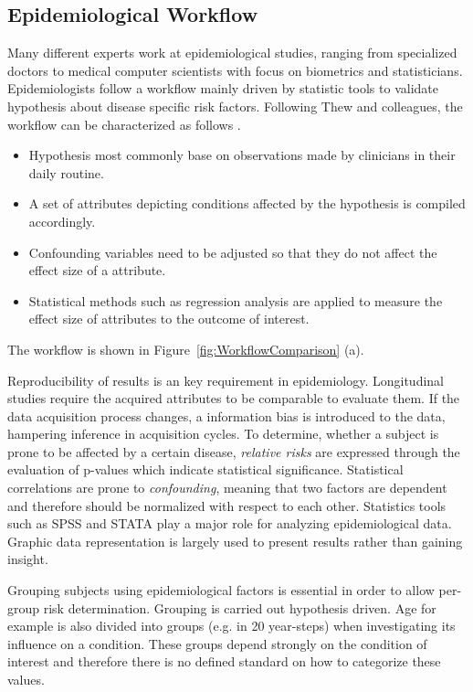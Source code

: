 \documentclass[journal]{style/vgtc} 			          %
\begin{document}
\subsection{Epidemiological Workflow} \label{EpidemiologicalWorkflow}
Many different experts work at epidemiological studies, ranging from specialized doctors to medical computer scientists with focus on biometrics and statisticians.
%
Epidemiologists follow a workflow mainly driven by statistic tools to validate hypothesis about disease specific risk factors.
%
Following Thew and colleagues, the workflow can be characterized as follows \cite{Thew2009}.
%
\begin{itemize}
	\item Hypothesis most commonly base on observations made by clinicians in their daily routine.
%
	\item A set of attributes depicting conditions affected by the hypothesis is compiled accordingly.
	\item Confounding variables need to be adjusted so that they do not affect the effect size of a attribute.
%
	\item Statistical methods such as regression analysis are applied to measure the effect size of attributes to the outcome of interest.
\end{itemize}
The workflow is shown in Figure~\ref{fig:WorkflowComparison} (a).

Reproducibility of results is an key requirement in epidemiology.
%
Longitudinal studies require the acquired attributes to be comparable to evaluate them.
%
If the data acquisition process changes, a information bias is introduced to the data, hampering inference in acquisition cycles.
%
%
To determine, whether a subject is prone to be affected by a certain disease, \emph{relative risks} are expressed through the evaluation of p-values which indicate statistical significance.
%
Statistical correlations are prone to \emph{confounding}, meaning that two factors are dependent and therefore should be normalized with respect to each other.
%
Statistics tools such as SPSS and STATA play a major role for analyzing epidemiological data.
%
Graphic data representation is largely used to present results rather than gaining insight.

Grouping subjects using epidemiological factors is essential in order to allow per-group risk determination.
%
Grouping is carried out hypothesis driven.
%
Age for example is also divided into groups (e.g. in 20 year-steps) when investigating its influence on a condition.
%
These groups depend strongly on the condition of interest and therefore there is no defined standard on how to categorize these values.
	
\end{document}
